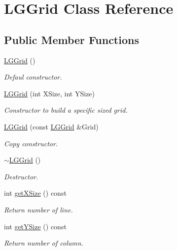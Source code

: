 \hypertarget{class_l_g_grid}{}\section{L\+G\+Grid Class Reference}
\label{class_l_g_grid}
\subsection*{Public Member Functions}
\begin{DoxyCompactItemize}
\item 
\hyperlink{class_l_g_grid_a7ed793fb862cfc57a1b56cb3a0f4110f}{L\+G\+Grid} ()
\begin{DoxyCompactList}\small\item\em Defaul constructor. \end{DoxyCompactList}\item 
\hyperlink{class_l_g_grid_ab6acdeeb8bd2409ee112e55cc195e984}{L\+G\+Grid} (int X\+Size, int Y\+Size)
\begin{DoxyCompactList}\small\item\em Constructor to build a specific sized grid. \end{DoxyCompactList}\item 
\hyperlink{class_l_g_grid_aabef61b2d56d7a7ad9c1ed25e91b0677}{L\+G\+Grid} (const \hyperlink{class_l_g_grid}{L\+G\+Grid} \&Grid)
\begin{DoxyCompactList}\small\item\em Copy constructor. \end{DoxyCompactList}\item 
\hyperlink{class_l_g_grid_a2522e4c8eed55410ff24836170badbc6}{$\sim$\+L\+G\+Grid} ()
\begin{DoxyCompactList}\small\item\em Destructor. \end{DoxyCompactList}\item 
int \hyperlink{class_l_g_grid_a154c933d8325453e41dcea84ccf5024d}{get\+X\+Size} () const 
\begin{DoxyCompactList}\small\item\em Return number of line. \end{DoxyCompactList}\item 
int \hyperlink{class_l_g_grid_a3334e87b2d9d91034a55a3f9935e7fc1}{get\+Y\+Size} () const 
\begin{DoxyCompactList}\small\item\em Return number of column. \end{DoxyCompactList}\item 

\end{DoxyCompactItemize}
